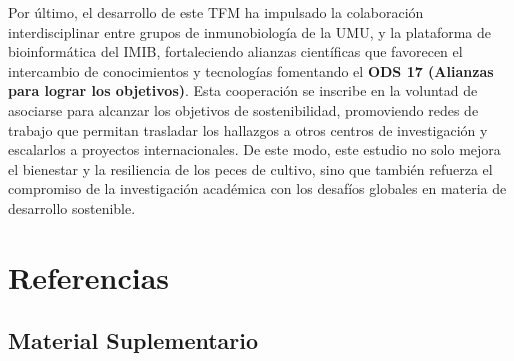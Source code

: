 \documentclass[10pt,a4paper]{article}
\begin{document}
Por último, el desarrollo de este TFM ha impulsado la colaboración interdisciplinar entre grupos de inmunobiología de la UMU, y la plataforma de bioinformática del IMIB, fortaleciendo alianzas científicas que favorecen el intercambio de conocimientos y tecnologías fomentando el  \textbf{ODS 17 (Alianzas para lograr los objetivos)}. Esta cooperación se inscribe en la voluntad de asociarse para alcanzar los objetivos de sostenibilidad, promoviendo redes de trabajo que permitan trasladar los hallazgos a otros centros de investigación y escalarlos a proyectos internacionales. De este modo, este estudio no solo mejora el bienestar y la resiliencia de los peces de cultivo, sino que también refuerza el compromiso de la investigación académica con los desafíos globales en materia de desarrollo sostenible.
\clearpage  

\section{Referencias}
\printbibliography[heading=none]

\clearpage
\appendix

\begin{center}
\section*{Material Suplementario}
\end{center}

\setcounter{figure}{0}
\renewcommand{\thefigure}{S\arabic{figure}}
\end{document}
